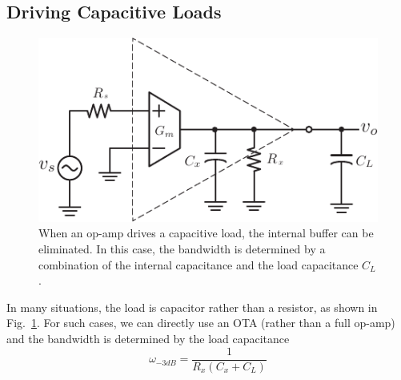 \subsection{Driving Capacitive Loads}
\begin{figure}[tb]
\begin{center}
\includegraphics[scale=1]{ota_amp_capload}
\end{center}
\caption{When an op-amp drives a capacitive load, the internal buffer can be eliminated.  In this case, the bandwidth is determined by a combination of the internal capacitance and the load capacitance $C_L$.}
\label{fig:ota_amp_capload}
\end{figure}

In many situations, the load is capacitor rather than a resistor, as shown in Fig.~\ref{fig:ota_amp_capload}.
 For such cases, we can directly use an OTA (rather than a full op-amp) and the bandwidth is determined by the load capacitance
\begin{equation}
	{\omega _{ - 3dB}} = \frac{1}{{{R_x}({C_x} + {C_L})}}
\end{equation}
%
%
